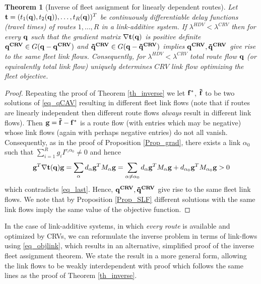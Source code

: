 \documentclass[a4paper,11pt]{article}
\newtheorem{theorem}{Theorem}
\begin{document}
\begin{theorem}[Inverse of fleet assignment for linearly dependent routes]
\label{th_inverselindep}
Let $\bold{t} = (t_1(\bold{q}), t_2(\bold{q})), \dots, t_R(\bold{q}))^T$ be continuously differentiable delay functions (travel times) of routes $1,\dots, R$ in a link-additive system. 
If $\lambda^{HDV} <  \lambda^{CRV}$ then for every $\bold{q}$ such that the gradient matrix $\nabla \bold{t}(\bold{q})$ is positive definite $\bold{q^{CRV}} \in G(\bold{q - q^{CRV}})$ and $\bold{\tilde{q}^{CRV}} \in G(\bold{q - \tilde{q}^{CRV}})$ implies $\bold{q^{CRV}}, \bold{\tilde{q}^{CRV}}$ give rise to the same fleet link flows. Consequently, for $\lambda^{HDV} <  \lambda^{CRV}$ total route flow $\bold{q}$ (or equivalently total link flow) uniquely determines $CRV$ link flow optimizing the fleet objective.
\end{theorem}
\begin{proof}
Repeating the proof of Theorem \ref{th_inverse} we let $\bold{f^*}$, $\bold{\tilde{f}}$ to be two solutions of \eqref{eq_qCAV} resulting in different fleet link flows (note that if routes are linearly independent then different route flows \emph{always} result in different link flows). Then $\bold{g} = \bold{\tilde{f}} - \bold{f^*}$ is a route flow (with entries which may be negative) whose link flows (again with perhaps negative entries) do not all vanish. Consequently, as in the proof of Proposition \ref{Prop_grad}, there exists a link $\alpha_0$ such that $\sum_{i=1}^R g_i I^{r_i \alpha_0} \neq 0$ and hence
\begin{eqnarray*}
\bold{g}^T \bold{\nabla t}(\bold{q}) \bold{g} =  \sum_\alpha d_\alpha \bold{g}^T M_\alpha \bold{g} = \sum_{\alpha \neq \alpha_0} d_\alpha \bold{g}^T M_\alpha \bold{g} + d_{\alpha_0} \bold{g}^T M_{\alpha_0} \bold{g} > 0
\end{eqnarray*}
which contradicts \eqref{eq_last}. Hence, $\bold{q^{CRV}}, \bold{\tilde{q}^{CRV}}$ give rise to the same fleet link flows. We note that by Proposition \ref{Prop_SLF} different solutions with the same link flows imply the same value of the objective function.


\end{proof}
In the case of link-additive systems, in which \emph{every route} is available and optimized by CRVs, we can reformulate the inverse problem in terms of link-flows using \eqref{eq_objlink}, which results in an alternative, simplified proof of the inverse fleet assignment theorem. We state the result in a more general form, allowing the link flows to be weakly interdependent with proof which follows the same lines as the proof of Theorem \ref{th_inverse}. 
\end{document}
